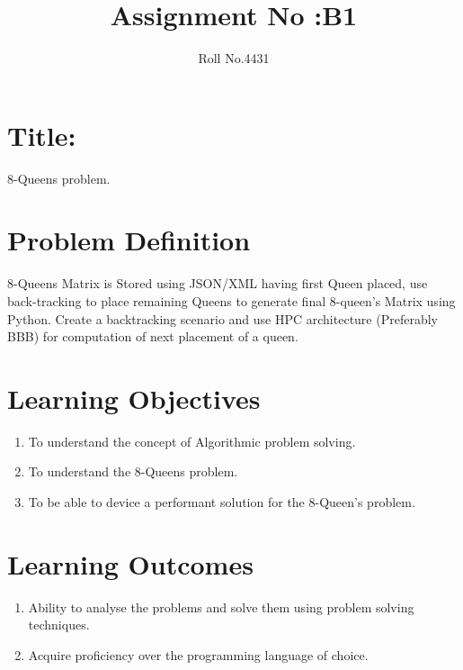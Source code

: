 \documentclass[10pt,a4paper]{article}
\title{Assignment No :B1}
\date{}
\author{Roll No.4431}
\begin{document}
\maketitle
\section{Title:}
8-Queens problem.

\section{Problem Definition}
8-Queens Matrix is Stored using JSON/XML having first Queen placed, use back-tracking to place remaining Queens to generate final 8-queen's Matrix using Python. Create a backtracking scenario and use HPC architecture (Preferably BBB) for computation of next placement of a queen.

\section{Learning Objectives}
\begin{enumerate}
\item To understand the concept of Algorithmic problem solving.
\item To understand the 8-Queens problem.
\item To be able to device a performant solution for the 8-Queen's problem.
\end{enumerate}

\section{Learning Outcomes}
\begin{enumerate}
\item Ability to analyse the problems and solve them using problem solving techniques.
\item Acquire proficiency over the programming language of choice.
\end{enumerate}
\end{document}
